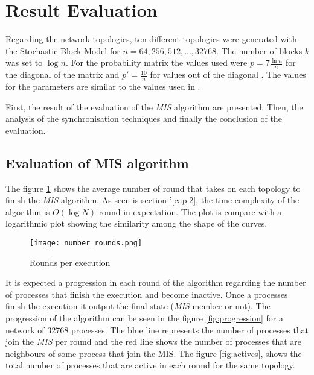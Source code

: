 \section{Result Evaluation}
\label{chap:6}
Regarding the network topologies, ten different topologies were generated with the Stochastic Block Model for $n = 64, 256, 512,..., 32768$. The number of blocks $k$ was set to $\log n$. For the probability matrix the values used were $p = 7{\tfrac {\ln n}{n}}$ for the diagonal of the matrix and  $p\prime = {\tfrac {10}{n}}$ for values out of the diagonal . The values for the parameters are similar to the values used in \cite{kothapalli2013analysis}.

First, the result of the evaluation of the \textit{MIS} algorithm are presented. Then, the analysis of the synchronisation techniques and finally the conclusion of the evaluation.



\subsection{Evaluation of MIS algorithm}

The figure \ref{fig:rounds_execution} shows the average number of round that takes on each topology to finish the \textit{MIS} algorithm. As seen is section '\ref{cap:2}, the time complexity of the algorithm is $O(\log N)$ round in expectation. The plot is compare with a logarithmic plot showing the similarity among the shape of the curves.


\begin{figure}[ht]
\centering
\texttt{[image: number\_rounds.png]} 
\caption{Rounds per execution}
\label{fig:rounds_execution}
\end{figure}

It is expected a progression in each round of the algorithm regarding the number of processes that finish the execution and become inactive. Once a processes finish the execution it output the final state (\textit{MIS} member or not). The progression of the algorithm can be seen in the figure \ref{fig:progression} for a network of 32768 processes. The blue line represents the number of processes that join the \textit{MIS}  per round and the red line shows the number of processes that are neighbours of some process that join the MIS. The figure \ref{fig:actives}, shows the total number of processes that are active in each round for the same topology. 

